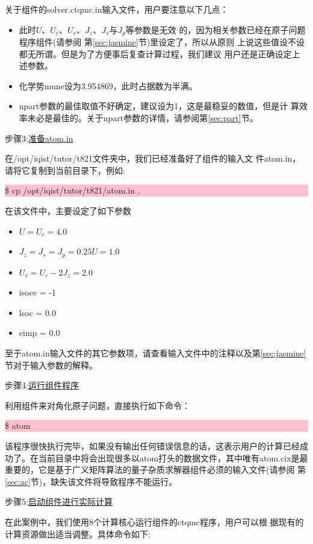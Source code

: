 关于{\begonia}组件的solver.ctqmc.in输入文件，用户要注意以下几点：
\begin{itemize}
  \item 此时$U$、$U_{c}$、$U_{v}$、$J_{z}$、$J_{s}$与$J_{p}$等参数是无效
        的，因为相关参数已经在原子问题程序{\jasmine}组件(请参阅
        第\ref{sec:jasmine}节)里设定了，所以从原则
        上说这些值设不设都无所谓。但是为了方便事后复查计算过程，我们建议
        用户还是正确设定上述参数。
  \item 化学势mune设为3.954869，此时占据数为半满。
  \item npart参数的最佳取值不好确定，建议设为1，这是最稳妥的数值，但是计
        算效率未必是最佳的。关于npart参数的详情，请参阅第\ref{sec:part}节。
\end{itemize}

步骤3:\underline{准备atom.in}

在/opt/iqist/tutor/t821文件夹中，我们已经准备好了{\jasmine}组件的输入文
件atom.in，请将它复制到当前目录下，例如:

\noindent\colorbox{pink}{\parbox[r]{\linewidth}{\quad \$ cp /opt/iqist/tutor/t821/atom.in . }}

在该文件中，主要设定了如下参数
\begin{itemize}
\item $U=U_{c}=4.0$
\item $J_{z}=J_{s}=J_{p}=0.25U=1.0$
\item $U_{v}=U_{c}-2J_{z}=2.0$
\item isoce = -1
\item lsoc = 0.0
\item eimp = 0.0
\end{itemize}
至于atom.in输入文件的其它参数项，请查看输入文件中的注释以及第\ref{sec:jasmine}
节对于输入参数的解释。

步骤4:\underline{运行{\jasmine}组件程序}

利用{\jasmine}组件来对角化原子问题，直接执行如下命令：

\noindent\colorbox{pink}{\parbox[r]{\linewidth}{\quad \$ atom }}

该程序很快执行完毕，如果没有输出任何错误信息的话，这表示用户的计算已经成
功了。在当前目录中将会出现很多以atom打头的数据文件，其中唯有atom.cix是最
重要的，它是基于广义矩阵算法的量子杂质求解器组件必须的输入文件(请参阅
第\ref{sec:ac}节)，缺失该文件将导致{\begonia}程序不能运行。

步骤5:\underline{启动{\begonia}组件进行实际计算}

在此案例中，我们使用8个计算核心运行{\begonia}组件的ctqmc程序，用户可以根
据现有的计算资源做出适当调整。具体命令如下:


